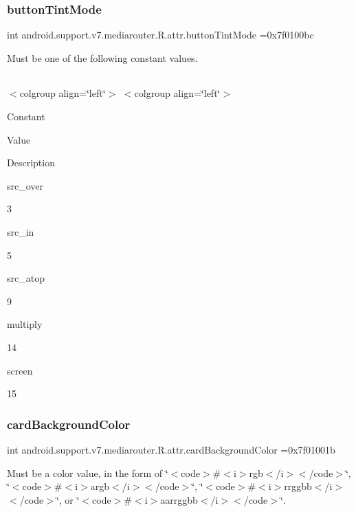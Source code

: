 \subsubsection{\texorpdfstring{button\+Tint\+Mode}{buttonTintMode}}
{\footnotesize\ttfamily int android.\+support.\+v7.\+mediarouter.\+R.\+attr.\+button\+Tint\+Mode =0x7f0100bc\hspace{0.3cm}{\ttfamily [static]}}

Must be one of the following constant values.

\tabulinesep=1mm
\begin{longtabu} spread 0pt [c]{*{0}{|X[-1]}|}
\hline
\end{longtabu}
$<$colgroup align=\char`\"{}left\char`\"{}$>$ $<$colgroup align=\char`\"{}left\char`\"{}$>$ 

Constant

Value

Description 

{\ttfamily src\+\_\+over}

3

{\ttfamily src\+\_\+in}

5

{\ttfamily src\+\_\+atop}

9

{\ttfamily multiply}

14

{\ttfamily screen}

15\mbox{\label{classandroid_1_1support_1_1v7_1_1mediarouter_1_1R_1_1attr_a03e2dd68efbbc61b11e0d2c98f2c95ab}} 
\subsubsection{\texorpdfstring{card\+Background\+Color}{cardBackgroundColor}}
{\footnotesize\ttfamily int android.\+support.\+v7.\+mediarouter.\+R.\+attr.\+card\+Background\+Color =0x7f01001b\hspace{0.3cm}{\ttfamily [static]}}

Must be a color value, in the form of \char`\"{}$<$code$>$\#$<$i$>$rgb$<$/i$>$$<$/code$>$\char`\"{}, \char`\"{}$<$code$>$\#$<$i$>$argb$<$/i$>$$<$/code$>$\char`\"{}, \char`\"{}$<$code$>$\#$<$i$>$rrggbb$<$/i$>$$<$/code$>$\char`\"{}, or \char`\"{}$<$code$>$\#$<$i$>$aarrggbb$<$/i$>$$<$/code$>$\char`\"{}. 

